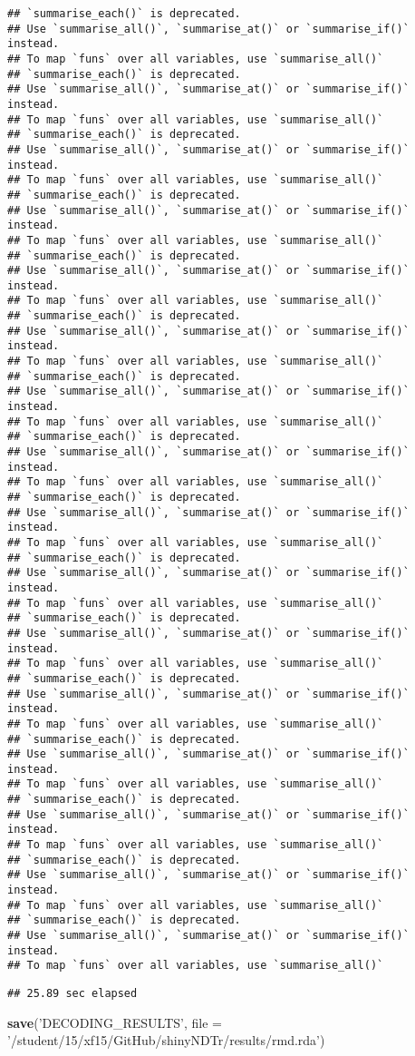 \documentclass[]{article}
\newenvironment{Shaded}{\begin{snugshade}}{\end{snugshade}}
\newcommand{\KeywordTok}[1]{\textcolor[rgb]{0.13,0.29,0.53}{\textbf{#1}}}
\newcommand{\DataTypeTok}[1]{\textcolor[rgb]{0.13,0.29,0.53}{#1}}
\newcommand{\StringTok}[1]{\textcolor[rgb]{0.31,0.60,0.02}{#1}}
\newcommand{\NormalTok}[1]{#1}
\begin{document}
\begin{verbatim}
## `summarise_each()` is deprecated.
## Use `summarise_all()`, `summarise_at()` or `summarise_if()` instead.
## To map `funs` over all variables, use `summarise_all()`
## `summarise_each()` is deprecated.
## Use `summarise_all()`, `summarise_at()` or `summarise_if()` instead.
## To map `funs` over all variables, use `summarise_all()`
## `summarise_each()` is deprecated.
## Use `summarise_all()`, `summarise_at()` or `summarise_if()` instead.
## To map `funs` over all variables, use `summarise_all()`
## `summarise_each()` is deprecated.
## Use `summarise_all()`, `summarise_at()` or `summarise_if()` instead.
## To map `funs` over all variables, use `summarise_all()`
## `summarise_each()` is deprecated.
## Use `summarise_all()`, `summarise_at()` or `summarise_if()` instead.
## To map `funs` over all variables, use `summarise_all()`
## `summarise_each()` is deprecated.
## Use `summarise_all()`, `summarise_at()` or `summarise_if()` instead.
## To map `funs` over all variables, use `summarise_all()`
## `summarise_each()` is deprecated.
## Use `summarise_all()`, `summarise_at()` or `summarise_if()` instead.
## To map `funs` over all variables, use `summarise_all()`
## `summarise_each()` is deprecated.
## Use `summarise_all()`, `summarise_at()` or `summarise_if()` instead.
## To map `funs` over all variables, use `summarise_all()`
## `summarise_each()` is deprecated.
## Use `summarise_all()`, `summarise_at()` or `summarise_if()` instead.
## To map `funs` over all variables, use `summarise_all()`
## `summarise_each()` is deprecated.
## Use `summarise_all()`, `summarise_at()` or `summarise_if()` instead.
## To map `funs` over all variables, use `summarise_all()`
## `summarise_each()` is deprecated.
## Use `summarise_all()`, `summarise_at()` or `summarise_if()` instead.
## To map `funs` over all variables, use `summarise_all()`
## `summarise_each()` is deprecated.
## Use `summarise_all()`, `summarise_at()` or `summarise_if()` instead.
## To map `funs` over all variables, use `summarise_all()`
## `summarise_each()` is deprecated.
## Use `summarise_all()`, `summarise_at()` or `summarise_if()` instead.
## To map `funs` over all variables, use `summarise_all()`
## `summarise_each()` is deprecated.
## Use `summarise_all()`, `summarise_at()` or `summarise_if()` instead.
## To map `funs` over all variables, use `summarise_all()`
## `summarise_each()` is deprecated.
## Use `summarise_all()`, `summarise_at()` or `summarise_if()` instead.
## To map `funs` over all variables, use `summarise_all()`
## `summarise_each()` is deprecated.
## Use `summarise_all()`, `summarise_at()` or `summarise_if()` instead.
## To map `funs` over all variables, use `summarise_all()`
\end{verbatim}

\begin{verbatim}
## 25.89 sec elapsed
\end{verbatim}

\begin{Shaded}
\begin{Highlighting}[]
\KeywordTok{save}\NormalTok{(}\StringTok{'DECODING_RESULTS'}\NormalTok{, }\DataTypeTok{file =} \StringTok{'/student/15/xf15/GitHub/shinyNDTr/results/rmd.rda'}\NormalTok{)}
\end{Highlighting}
\end{Shaded}
\end{document}
